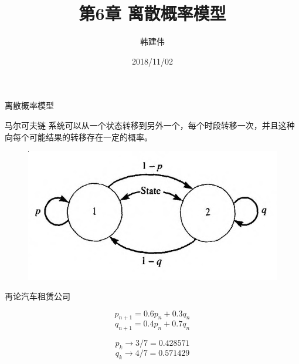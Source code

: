 \documentclass[UTF8]{ctexbeamer}
\title{第6章 离散概率模型}
\author{韩建伟}
\institute{
  信息学院\\
  \texttt{hanjianwei@zjgsu.edu.cn}
}
\date{2018/11/02}
\begin{document}
\begin{frame}[plain]
  \titlepage{}
\end{frame}

\begin{frame}{离散概率模型}

  \begin{block}{马尔可夫链}
    系统可以从一个状态转移到另外一个，每个时段转移一次，并且这种向每个可能结果的转移存在一定的概率。
  \end{block}

  \begin{figure}
    \centering
    \includegraphics[width=0.6\textwidth{}]{markov.png}
  \end{figure}

\end{frame}

\begin{frame}{再论汽车租赁公司}
  \begin{figure}
    \centering
  \end{figure}

  \[
  p_{n+1} = 0.6p_n + 0.3q_n
  \]
  \[
  q_{n+1} = 0.4p_n + 0.7q_n
  \]

  \[
  p_k \rightarrow 3/7 = 0.428571
  \]
  \[
  q_k \rightarrow 4/7 = 0.571429
  \]
\end{frame}
\end{document}
